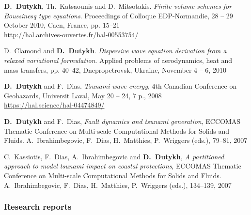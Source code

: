 \begin{etaremune}

  
  \item \textbf{D.~Dutykh}, Th.~Katsaounis and D.~Mitsotakis. \textit{Finite volume schemes for Boussinesq type equations}. Proceedings of Colloque EDP-Normandie, 28 -- 29 October 2010, Caen, France, pp. 15--21 \\ %
  \url{http://hal.archives-ouvertes.fr/hal-00553754/}

  \item D.~Clamond and \textbf{D.~Dutykh}. \textit{Dispersive wave equation derivation from a relaxed variational formulation}. Applied problems of aerodynamics, heat and mass transfers, pp. 40--42, Dnepropetrovsk, Ukraine, November 4 -- 6, 2010 %
  


  \item \textbf{D.~Dutykh} and F.~Dias. \textit{Tsunami wave energy}, 4th Canadian Conference on Geohazards, Universit Laval, May 20 -- 24, 7 p., 2008 \\ %
  \url{https://hal.science/hal-04474849/}
  


  \item \textbf{D.~Dutykh} and F.~Dias, \textit{Fault dynamics and tsunami generation}, ECCOMAS Thematic Conference on Multi-scale Computational Methods for Solids and Fluids. A.~Ibrahimbegovic, F.~Dias, H.~Matthies, P.~Wriggers (eds.), 79--81, 2007 %

  \item C.~Kassiotis, F.~Dias, A.~Ibrahimbegovic and \textbf{D.~Dutykh}, \textit{A partitioned approach to model tsunami impact on coastal protections}, ECCOMAS Thematic Conference on Multi-scale Computational Methods for Solids and Fluids. A.~Ibrahimbegovic, F.~Dias, H.~Matthies, P.~Wriggers (eds.), 134--139, 2007 %
  
\end{etaremune}

\separator
\subsubsection{Research reports}

